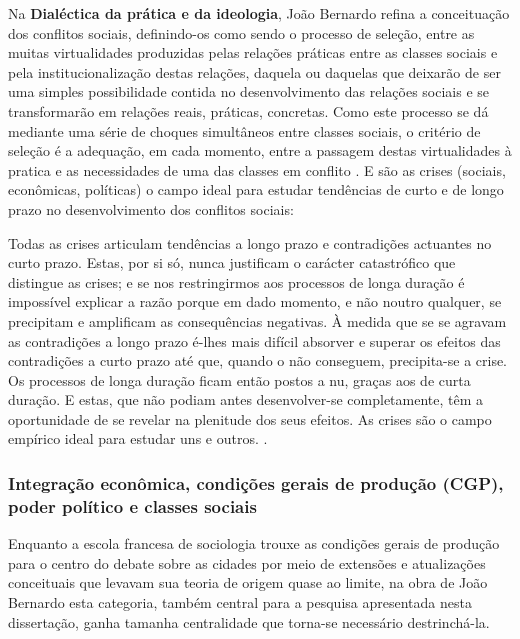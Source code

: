 Na \textbf{Dialéctica da prática e da ideologia}, João Bernardo refina a conceituação dos conflitos sociais, definindo-os como sendo o processo de seleção, entre as muitas virtualidades produzidas pelas relações práticas entre as classes sociais e pela institucionalização destas relações, daquela ou daquelas que deixarão de ser uma simples possibilidade contida no desenvolvimento das relações sociais e se transformarão em relações reais, práticas, concretas. Como este processo se dá mediante uma série de choques simultâneos entre classes sociais, o critério de seleção é a adequação, em cada momento, entre a passagem destas virtualidades à pratica e as necessidades de uma das classes em conflito \cite[p.~31-32]{BERNARDO1991a}. E são as crises (sociais, econômicas, políticas) o campo ideal para estudar tendências de curto e de longo prazo no desenvolvimento dos conflitos sociais:

\begin{citacao}
Todas as crises articulam tendências a longo prazo e contradições actuantes no curto prazo. Estas, por si só, nunca justificam o carácter catastrófico que distingue as crises; e se nos restringirmos aos processos de longa duração é impossível explicar a razão porque em dado momento, e não noutro qualquer, se precipitam e amplificam as consequências negativas. À medida que se se agravam as contradições a longo prazo é-lhes mais difícil absorver e superar os efeitos das contradições a curto prazo até que, quando o não conseguem, precipita-se a crise. Os processos de longa duração ficam então postos a nu, graças aos de curta duração. E estas, que não podiam antes desenvolver-se completamente, têm a oportunidade de se revelar na plenitude dos seus efeitos. As crises são o campo empírico ideal para estudar uns e outros. \cite[p.~128]{BERNARDO1997}.
\end{citacao}

\subsubsection{Integração econômica, condições gerais de produção (CGP), poder político e classes sociais}\label{intecocgpppcs}

Enquanto a escola francesa de sociologia trouxe as condições gerais de produção para o centro do debate sobre as cidades por meio de extensões e atualizações conceituais que levavam sua teoria de origem quase ao limite, na obra de João Bernardo esta categoria, também central para a pesquisa apresentada nesta dissertação, ganha tamanha centralidade que torna-se necessário destrinchá-la.

